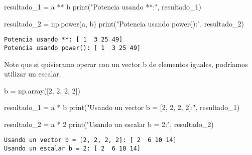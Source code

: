 \documentclass[
  letterpaper,
  DIV=11,
  numbers=noendperiod]{scrreprt}
\newenvironment{Shaded}{\begin{snugshade}}{\end{snugshade}}
\newcommand{\BuiltInTok}[1]{\textcolor[rgb]{0.00,0.23,0.31}{#1}}
\newcommand{\DecValTok}[1]{\textcolor[rgb]{0.68,0.00,0.00}{#1}}
\newcommand{\NormalTok}[1]{\textcolor[rgb]{0.00,0.23,0.31}{#1}}
\newcommand{\OperatorTok}[1]{\textcolor[rgb]{0.37,0.37,0.37}{#1}}
\newcommand{\StringTok}[1]{\textcolor[rgb]{0.13,0.47,0.30}{#1}}
\begin{document}
\begin{Shaded}
\begin{Highlighting}[]
\NormalTok{resultado\_1 }\OperatorTok{=}\NormalTok{ a }\OperatorTok{**}\NormalTok{ b}
\BuiltInTok{print}\NormalTok{(}\StringTok{"Potencia usando **:"}\NormalTok{, resultado\_1) }

\NormalTok{resultado\_2 }\OperatorTok{=}\NormalTok{ np.power(a, b)}
\BuiltInTok{print}\NormalTok{(}\StringTok{"Potencia usando power():"}\NormalTok{, resultado\_2) }
\end{Highlighting}
\end{Shaded}

\begin{verbatim}
Potencia usando **: [ 1  3 25 49]
Potencia usando power(): [ 1  3 25 49]
\end{verbatim}

\begin{tcolorbox}[enhanced jigsaw, opacityback=0, coltitle=black, toptitle=1mm, colframe=quarto-callout-note-color-frame, leftrule=.75mm, colback=white, opacitybacktitle=0.6, toprule=.15mm, breakable, bottomrule=.15mm, rightrule=.15mm, bottomtitle=1mm, titlerule=0mm, title=\textcolor{quarto-callout-note-color}{\faInfo}\hspace{0.5em}{Note}, colbacktitle=quarto-callout-note-color!10!white, left=2mm, arc=.35mm]

Note que si quisieramo operar con un vector b de elementos iguales,
podríamos utilizar un escalar.

\end{tcolorbox}

\begin{Shaded}
\begin{Highlighting}[]
\NormalTok{b }\OperatorTok{=}\NormalTok{ np.array([}\DecValTok{2}\NormalTok{, }\DecValTok{2}\NormalTok{, }\DecValTok{2}\NormalTok{, }\DecValTok{2}\NormalTok{])}

\NormalTok{resultado\_1 }\OperatorTok{=}\NormalTok{ a }\OperatorTok{*}\NormalTok{ b}
\BuiltInTok{print}\NormalTok{(}\StringTok{"Usando un vector b = [2, 2, 2, 2]:"}\NormalTok{, resultado\_1) }

\NormalTok{resultado\_2 }\OperatorTok{=}\NormalTok{ a }\OperatorTok{*} \DecValTok{2}
\BuiltInTok{print}\NormalTok{(}\StringTok{"Usando un escalar b = 2:"}\NormalTok{, resultado\_2) }
\end{Highlighting}
\end{Shaded}

\begin{verbatim}
Usando un vector b = [2, 2, 2, 2]: [ 2  6 10 14]
Usando un escalar b = 2: [ 2  6 10 14]
\end{verbatim}
\end{document}
